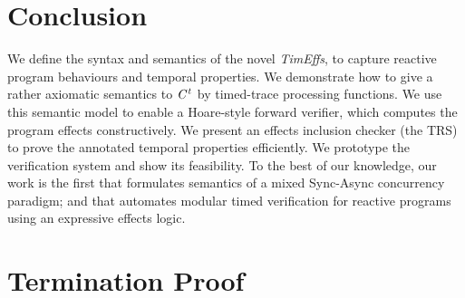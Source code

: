 \documentclass[acmsmall,10pt,review]{acmart}
\newcommand{\timedEffects}{\emph{TimEffs}}
\newcommand{\code}[1]{{\tt{\ensuremath{\m{#1}}}}}
\newcommand{\m}{\mathit}
\newcommand{\timedL}{\code{C^{t}}}
\begin{document}
\section{Conclusion}
\label{sec:conclusion}
We define the syntax and semantics of the novel \timedEffects, to capture reactive program behaviours and  temporal properties. We demonstrate how to give a rather axiomatic semantics to \code{\timedL} by timed-trace processing functions. We use this semantic model to enable  a Hoare-style forward verifier,  which computes the program effects constructively.
We present an effects inclusion checker (the TRS) to prove the annotated temporal properties efficiently. We prototype the verification system and show its feasibility.
To the best of our knowledge, our work is the first that formulates semantics of a mixed Sync-Async concurrency paradigm; and that automates modular timed verification for reactive programs using an expressive effects logic. 










\appendix

\section{Termination Proof}  \label{proof:TerminationProof}
\end{document}
